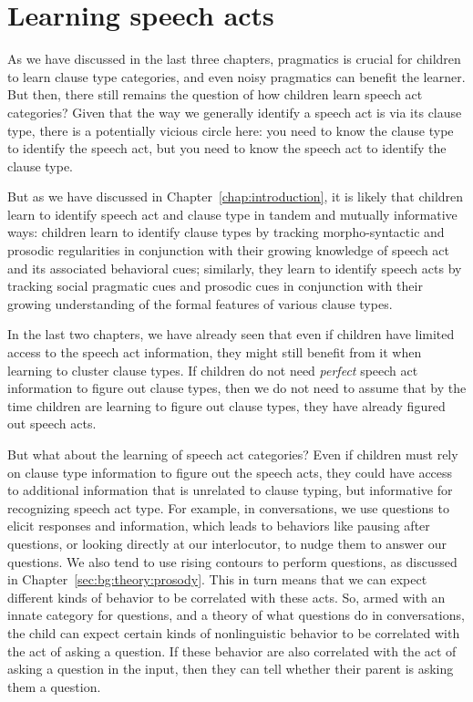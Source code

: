 \chapter{Learning speech acts}
\label{chap:eng-sp}

As we have discussed in the last three chapters, pragmatics is crucial for children to learn clause type categories, and even noisy pragmatics can benefit the learner. But then, there still remains the question of how children learn speech act categories? Given that the way we generally identify a speech act is via its clause type, there is a potentially vicious circle here: you need to know the clause type to identify the speech act, but you need to know the speech act to identify the clause type. %

But as we have discussed in Chapter~\ref{chap:introduction}, it is likely that children learn to identify speech act and clause type in tandem and mutually informative ways: children learn to identify clause types by tracking morpho-syntactic and prosodic regularities in conjunction with their growing
knowledge of speech act and its associated behavioral cues; similarly, they learn
to identify speech acts by tracking social pragmatic cues and prosodic cues in conjunction with their growing
understanding of the formal features of various clause types.


In the last two chapters, we have already seen that even if children have limited access to the speech act information, they might still benefit from it when learning to cluster clause types. If children do not need \emph{perfect} speech act information to figure out clause types, then we do not need to assume that by the time children are learning to figure out clause types, they have already figured out speech acts. 

But what about the learning of speech act categories? Even if children must rely on clause type information to figure out the speech acts, they could have access to additional information that is unrelated to clause typing, but informative for recognizing speech act type. For example, in conversations, we use questions to elicit responses and information, which leads to behaviors like pausing after questions, or looking directly at our interlocutor, to nudge them to answer our questions. We also tend to use rising contours to perform questions, as discussed in Chapter~\ref{sec:bg:theory:prosody}.
This in turn means that we can expect different kinds of behavior to be correlated with these acts. So, armed with an innate category for questions, and a theory of what questions do in conversations, the child can expect certain kinds of nonlinguistic behavior to be correlated with the act of asking a question. If these behavior are also correlated with the act of asking a question in the input, then they can tell whether their parent is asking them a question.  

